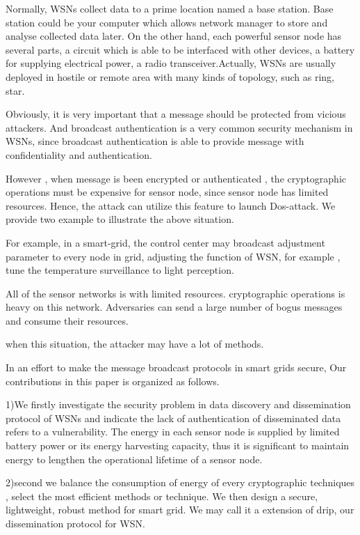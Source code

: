 \documentclass[lnicst,sechang,a4paper]{svmultln}
\begin{document}
Normally, WSNs collect data to a prime location named a base station. Base station could be your computer which allows network manager to store and analyse collected data later. On the other hand, each powerful sensor node has several parts, a circuit which is able to be interfaced with other devices, a battery for supplying electrical power, a radio transceiver.Actually, WSNs are usually deployed in hostile or remote area with many kinds of topology, such as ring, star. 

Obviously, it is very important that a message should be protected from vicious attackers. And broadcast authentication is a very common security mechanism in WSNs, since broadcast authentication is able to provide message with confidentiality and authentication. 

However , when message is been encrypted or authenticated , the cryptographic operations must be expensive for sensor node, since sensor node has limited  resources.  Hence, the attack can utilize this feature to launch Dos-attack.
We provide two example to illustrate the above situation.

For example, in a smart-grid, the control center may broadcast adjustment parameter to every node in grid, adjusting the function of WSN, for example , tune the temperature surveillance to light perception. 

All of the sensor networks is with limited resources. cryptographic operations is heavy on this network. Adversaries can send a large number of bogus messages and consume their resources.

when this situation, the attacker may have a lot of methods.

In an effort to make the message broadcast protocols in smart grids secure, Our contributions in this paper is organized as follows.

1)We firstly investigate the security problem in data discovery and dissemination protocol of WSNs and indicate the lack of authentication of disseminated data refers to a vulnerability. The energy in each sensor node is supplied by limited battery power or its energy harvesting capacity, thus it is significant to maintain energy to lengthen the operational lifetime of a sensor node.

2)second we balance the consumption of energy of every cryptographic techniques , select the most efficient methods or technique. We then design a secure, lightweight, robust method for smart grid. We may call it a extension of drip, our dissemination protocol for WSN.
\end{document}
